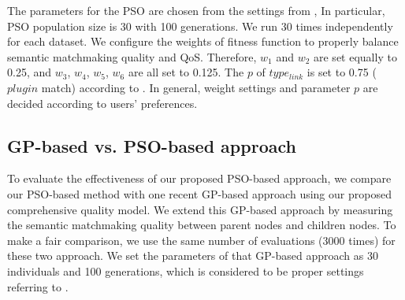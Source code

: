 The parameters for the PSO are chosen from the settings from \cite{shi2001particle}, In particular, PSO population size is 30 with 100 generations. We run 30 times independently for each dataset. We configure the weights of fitness function to properly balance semantic matchmaking quality and QoS. Therefore, $w_{1}$ and $w_{2}$ are set equally to 0.25, and $w_{3}$, $w_{4}$, $w_{5}$, $w_{6}$ are all set to 0.125. The $p$ of $type_{link}$ is set to 0.75 ($plugin$ match) according to \cite{lecue2009optimizing}. In general, weight settings and parameter $p$ are decided according to users' preferences.

\subsection{GP-based vs. PSO-based approach}\label{comparisonTestWithGP}
To evaluate the effectiveness of our proposed PSO-based approach, we compare our PSO-based method with one recent GP-based approach \cite{ma2015hybrid} using our proposed comprehensive quality model. We extend this GP-based approach by measuring the semantic matchmaking quality between parent nodes and children nodes. To make a fair comparison, we use the same number of evaluations (3000 times) for these two approach. We set the parameters of that GP-based approach as 30 individuals and 100 generations, which is considered to be proper settings referring to \cite{da2015gp}.

